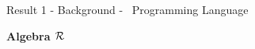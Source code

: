 \begin{frame}{Result 1 - Background - \WhileCC\ Programming Language}
\begin{minipage}[t]{0.33\linewidth}
\begin{itemize}
            \end{itemize}
    \end{minipage}
    \begin{minipage}[t]{0.34\linewidth}
         \pause 
         \begin{center}
            \vspace{-1.8em}
             \textbf{\color{Blue}Algebra $\mathcal{R}$}
         \end{center}
         \begin{center}
        \end{center}
        

\end{minipage}
\end{frame}
